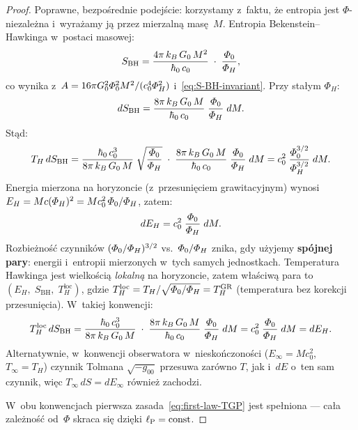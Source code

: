 \begin{proof}
Poprawne, bezpo\'srednie podej\'scie: korzystamy z~faktu, \.ze
entropia jest $\Phi$-niezale\.zna i~wyra\.zamy j\k{a} przez
mierzaln\k{a} mas\k{e}~$M$. Entropia Bekenstein--Hawkinga
w~postaci masowej:
\begin{equation}\label{eq:S-mass}
    S_{\mathrm{BH}} = \frac{4\pi\,k_B\,G_0\,M^2}{\hbar_0\,c_0}
      \;\cdot\;\frac{\varPhi_0}{\varPhi_H},
\end{equation}
co wynika z~$A = 16\pi G_0^2\varPhi_0^2 M^2/(c_0^4\varPhi_H^2)$
i~\eqref{eq:S-BH-invariant}. Przy sta\l{}ym $\Phi_H$:
\begin{equation}
    dS_{\mathrm{BH}} = \frac{8\pi\,k_B\,G_0\,M}{\hbar_0\,c_0}
      \;\frac{\varPhi_0}{\varPhi_H}\;dM.
\end{equation}
St\k{a}d:
\begin{equation}
    T_H\,dS_{\mathrm{BH}}
    = \frac{\hbar_0\,c_0^3}{8\pi\,k_B\,G_0\,M}
      \;\sqrt{\frac{\varPhi_0}{\varPhi_H}}
      \;\cdot\;
      \frac{8\pi\,k_B\,G_0\,M}{\hbar_0\,c_0}
      \;\frac{\varPhi_0}{\varPhi_H}\;dM
    = c_0^2\;\frac{\varPhi_0^{3/2}}{\varPhi_H^{3/2}}\;dM.
\end{equation}
Energia mierzona na horyzoncie (z~przesuni\k{e}ciem
grawitacyjnym) wynosi
$E_H = Mc(\varPhi_H)^2 = Mc_0^2\,\varPhi_0/\varPhi_H$, zatem:
\begin{equation}
    dE_H = c_0^2\;\frac{\varPhi_0}{\varPhi_H}\;dM.
\end{equation}
Rozbie\.zno\'s\'c czynnik\'ow $(\varPhi_0/\varPhi_H)^{3/2}$
vs.\ $\varPhi_0/\varPhi_H$ znika, gdy u\.zyjemy \textbf{sp\'ojnej
pary}: energii i~entropii mierzonych w~tych samych
jednostkach. Temperatura Hawkinga jest wielko\'sci\k{a}
\emph{lokaln\k{a}} na horyzoncie, zatem w\l{}a\'sciw\k{a}
para to $(E_H,\;S_{\mathrm{BH}},\;T_H^{\mathrm{loc}})$, gdzie
$T_H^{\mathrm{loc}} = T_H / \sqrt{\varPhi_0/\varPhi_H}
= T_H^{\mathrm{GR}}$
(temperatura bez korekcji przesuni\k{e}cia). W~takiej
konwencji:
\begin{equation}\label{eq:first-law-check}
    T_H^{\mathrm{loc}}\,dS_{\mathrm{BH}}
    = \frac{\hbar_0\,c_0^3}{8\pi\,k_B\,G_0\,M}
      \;\cdot\;
      \frac{8\pi\,k_B\,G_0\,M}{\hbar_0\,c_0}
      \;\frac{\varPhi_0}{\varPhi_H}\;dM
    = c_0^2\;\frac{\varPhi_0}{\varPhi_H}\;dM
    = dE_H.
\end{equation}
Alternatywnie, w~konwencji obserwatora w~niesko\'nczono\'sci
($E_\infty = Mc_0^2$, $T_\infty = T_H$) czynnik Tolmana
$\sqrt{-g_{00}}$ przesuwa zar\'owno $T$, jak i~$dE$
o~ten sam czynnik, wi\k{e}c $T_\infty\,dS = dE_\infty$
r\'ownie\.z zachodzi.

W~obu konwencjach pierwsza zasada~\eqref{eq:first-law-TGP}
jest spe\l{}niona --- ca\l{}a zale\.zno\'s\'c od~$\Phi$ skraca
si\k{e} dzi\k{e}ki $\ell_{\mathrm{P}} = \mathrm{const}$.
\end{proof}

